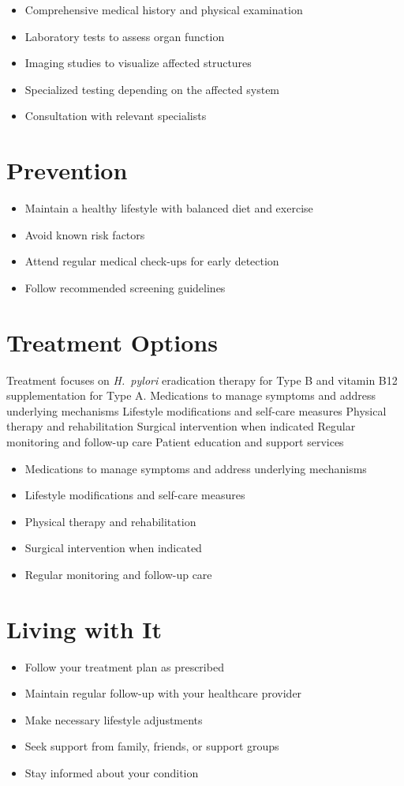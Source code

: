 \begin{itemize}[noitemsep]
  \item Comprehensive medical history and physical examination
  \item Laboratory tests to assess organ function
  \item Imaging studies to visualize affected structures
  \item Specialized testing depending on the affected system
  \item Consultation with relevant specialists
\end{itemize}
\section{Prevention}
\begin{itemize}[noitemsep]
  \item Maintain a healthy lifestyle with balanced diet and exercise
  \item Avoid known risk factors
  \item Attend regular medical check-ups for early detection
  \item Follow recommended screening guidelines
\end{itemize}
\section{Treatment Options}
Treatment focuses on \textit{H.~pylori} eradication therapy for Type B and vitamin B12 supplementation for Type A. Medications to manage symptoms and address underlying mechanisms Lifestyle modifications and self-care measures Physical therapy and rehabilitation Surgical intervention when indicated Regular monitoring and follow-up care Patient education and support services

\begin{itemize}[noitemsep]
  \item Medications to manage symptoms and address underlying mechanisms
  \item Lifestyle modifications and self-care measures
  \item Physical therapy and rehabilitation
  \item Surgical intervention when indicated
  \item Regular monitoring and follow-up care
\end{itemize}
\section{Living with It}
\begin{itemize}[noitemsep]
  \item Follow your treatment plan as prescribed
  \item Maintain regular follow-up with your healthcare provider
  \item Make necessary lifestyle adjustments
  \item Seek support from family, friends, or support groups
  \item Stay informed about your condition
\end{itemize}
